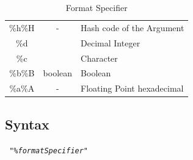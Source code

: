 \documentclass[A4 paper,openany]{book}  %
\begin{document}
\begin{table}[htbp]
\begin{tabular}{ccl}
        \%h\%H           & -                   & Hash code of the Argument                                                                                   \\
        \%d              &                     & Decimal Integer                                                                                             \\
        \%c              & \textbf{}           & Character                                                                                                   \\
        \%b\%B           & boolean             & Boolean                                                                                                     \\
        \%a\%A           & -                   & Floating Point hexadecimal
    \end{tabular}
    \centering
    \caption{Format Specifier}
\end{table}
% 
%
\subsection{Syntax}
\begin{center}
    \tt{
        \textit{"\%formatSpecifier"}
    }
\end{center}
% 
%
\end{document}
